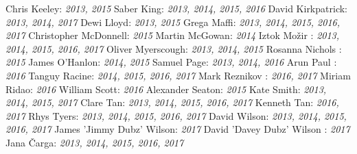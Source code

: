 \begin{tcolorbox}
\begin{fullwidth}
\begin{multicols}{2}
Chris Keeley: \textsl{2013, 2015 }
\newline
Saber King: \textsl{2013, 2014, 2015, 2016 }
\newline
David Kirkpatrick: \textsl{2013, 2014, 2017 }
\newline
Dewi Lloyd: \textsl{2013, 2015 }
\newline
Grega Maffi: \textsl{2013, 2014, 2015, 2016, 2017 }
\newline
Christopher McDonnell: \textsl{2015 }
\newline
Martin McGowan: \textsl{2014 }
\newline
Iztok Mo\v{z}ir : \textsl{2013, 2014, 2015, 2016, 2017 }
\newline
Oliver Myerscough: \textsl{2013, 2014, 2015 }
\newline
Rosanna Nichols : \textsl{2015 }
\newline
James O'Hanlon: \textsl{2014, 2015 }
\newline
Samuel Page: \textsl{2013, 2014, 2016 }
\newline
Arun Paul : \textsl{2016 }
\newline
Tanguy Racine: \textsl{2014, 2015, 2016, 2017 }
\newline
Mark Reznikov : \textsl{2016, 2017 }
\newline
Miriam Ridao: \textsl{2016 }
\newline
William Scott: \textsl{2016 }
\newline
Alexander Seaton: \textsl{2015 }
\newline
Kate Smith: \textsl{2013, 2014, 2015, 2017 }
\newline
Clare Tan: \textsl{2013, 2014, 2015, 2016, 2017 }
\newline
Kenneth Tan: \textsl{2016, 2017 }
\newline
Rhys Tyers: \textsl{2013, 2014, 2015, 2016, 2017 }
\newline
David Wilson: \textsl{2013, 2014, 2015, 2016, 2017 }
\newline
James 'Jimmy Dubz' Wilson: \textsl{2017 }
\newline
David 'Davey Dubz' Wilson : \textsl{2017 }
\newline
Jana \v{C}arga: \textsl{2013, 2014, 2015, 2016, 2017 }
\newline
\end{multicols} 
 \end{fullwidth} 
 \end{tcolorbox} 

